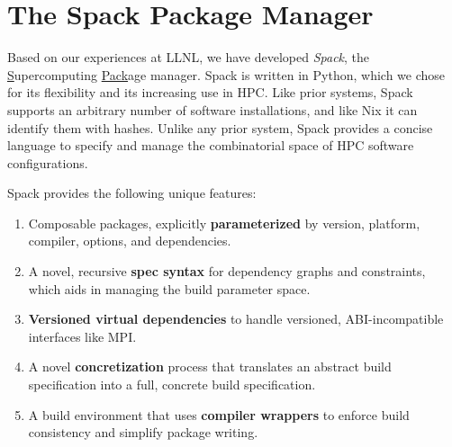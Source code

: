 
\section{The Spack Package Manager}
\label{sec:implementation}
Based on our experiences at LLNL, we have developed
{\it Spack}, the \underline{S}upercomputing \underline{Pack}age manager.
Spack is written in Python, which we chose for its flexibility
and its increasing use in HPC.
%
Like prior systems, Spack supports an arbitrary number of software
installations, and like Nix it can identify them with hashes.  Unlike any
prior system, Spack provides a concise language to specify and manage the
combinatorial space of HPC software configurations.

\noindent
Spack provides the following unique features:
\begin{enumerate}
\item Composable packages, explicitly {\bf parameterized} by version, platform,
      compiler, options, and dependencies.
\item A novel, recursive {\bf spec syntax} for dependency graphs and constraints,
      which aids in managing the build parameter space.
\item {\bf Versioned virtual dependencies} to handle versioned, 
      ABI-incompatible interfaces like MPI.
\item A novel {\bf concretization} process that translates an abstract build
      specification into a full, concrete build specification.
\item A build environment that uses {\bf compiler wrappers} to enforce build
      consistency and simplify package writing.
\end{enumerate}






